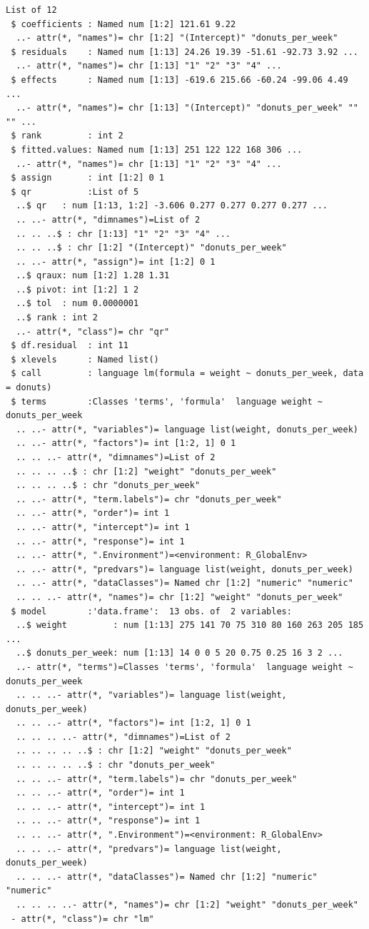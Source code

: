 \documentclass[]{book}
\begin{document}
\begin{verbatim}
List of 12
 $ coefficients : Named num [1:2] 121.61 9.22
  ..- attr(*, "names")= chr [1:2] "(Intercept)" "donuts_per_week"
 $ residuals    : Named num [1:13] 24.26 19.39 -51.61 -92.73 3.92 ...
  ..- attr(*, "names")= chr [1:13] "1" "2" "3" "4" ...
 $ effects      : Named num [1:13] -619.6 215.66 -60.24 -99.06 4.49 ...
  ..- attr(*, "names")= chr [1:13] "(Intercept)" "donuts_per_week" "" "" ...
 $ rank         : int 2
 $ fitted.values: Named num [1:13] 251 122 122 168 306 ...
  ..- attr(*, "names")= chr [1:13] "1" "2" "3" "4" ...
 $ assign       : int [1:2] 0 1
 $ qr           :List of 5
  ..$ qr   : num [1:13, 1:2] -3.606 0.277 0.277 0.277 0.277 ...
  .. ..- attr(*, "dimnames")=List of 2
  .. .. ..$ : chr [1:13] "1" "2" "3" "4" ...
  .. .. ..$ : chr [1:2] "(Intercept)" "donuts_per_week"
  .. ..- attr(*, "assign")= int [1:2] 0 1
  ..$ qraux: num [1:2] 1.28 1.31
  ..$ pivot: int [1:2] 1 2
  ..$ tol  : num 0.0000001
  ..$ rank : int 2
  ..- attr(*, "class")= chr "qr"
 $ df.residual  : int 11
 $ xlevels      : Named list()
 $ call         : language lm(formula = weight ~ donuts_per_week, data = donuts)
 $ terms        :Classes 'terms', 'formula'  language weight ~ donuts_per_week
  .. ..- attr(*, "variables")= language list(weight, donuts_per_week)
  .. ..- attr(*, "factors")= int [1:2, 1] 0 1
  .. .. ..- attr(*, "dimnames")=List of 2
  .. .. .. ..$ : chr [1:2] "weight" "donuts_per_week"
  .. .. .. ..$ : chr "donuts_per_week"
  .. ..- attr(*, "term.labels")= chr "donuts_per_week"
  .. ..- attr(*, "order")= int 1
  .. ..- attr(*, "intercept")= int 1
  .. ..- attr(*, "response")= int 1
  .. ..- attr(*, ".Environment")=<environment: R_GlobalEnv> 
  .. ..- attr(*, "predvars")= language list(weight, donuts_per_week)
  .. ..- attr(*, "dataClasses")= Named chr [1:2] "numeric" "numeric"
  .. .. ..- attr(*, "names")= chr [1:2] "weight" "donuts_per_week"
 $ model        :'data.frame':  13 obs. of  2 variables:
  ..$ weight         : num [1:13] 275 141 70 75 310 80 160 263 205 185 ...
  ..$ donuts_per_week: num [1:13] 14 0 0 5 20 0.75 0.25 16 3 2 ...
  ..- attr(*, "terms")=Classes 'terms', 'formula'  language weight ~ donuts_per_week
  .. .. ..- attr(*, "variables")= language list(weight, donuts_per_week)
  .. .. ..- attr(*, "factors")= int [1:2, 1] 0 1
  .. .. .. ..- attr(*, "dimnames")=List of 2
  .. .. .. .. ..$ : chr [1:2] "weight" "donuts_per_week"
  .. .. .. .. ..$ : chr "donuts_per_week"
  .. .. ..- attr(*, "term.labels")= chr "donuts_per_week"
  .. .. ..- attr(*, "order")= int 1
  .. .. ..- attr(*, "intercept")= int 1
  .. .. ..- attr(*, "response")= int 1
  .. .. ..- attr(*, ".Environment")=<environment: R_GlobalEnv> 
  .. .. ..- attr(*, "predvars")= language list(weight, donuts_per_week)
  .. .. ..- attr(*, "dataClasses")= Named chr [1:2] "numeric" "numeric"
  .. .. .. ..- attr(*, "names")= chr [1:2] "weight" "donuts_per_week"
 - attr(*, "class")= chr "lm"
\end{verbatim}
\end{document}
